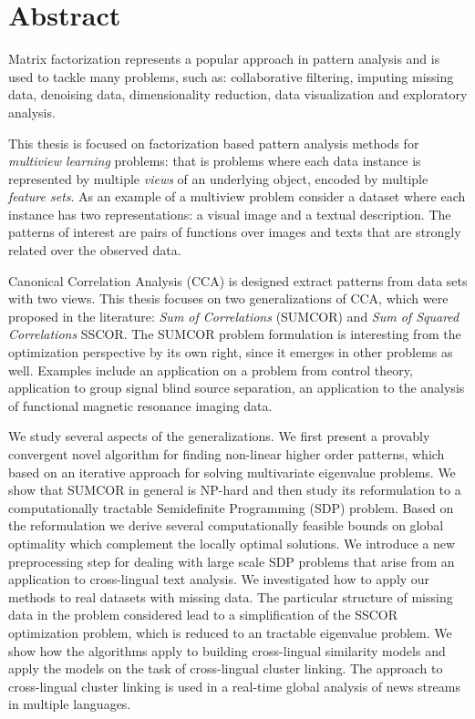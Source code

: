 %
\chapter*{Abstract}

Matrix factorization represents a popular approach in pattern analysis and
is used to tackle many problems, such as: collaborative filtering, imputing
missing data, denoising data, dimensionality reduction, data visualization and
exploratory analysis.  

This thesis is focused on factorization based pattern analysis methods 
for \emph{multiview learning} problems:
that is problems where each data instance is represented by multiple \emph{views} of an underlying
object, encoded by multiple \emph{feature sets}.
As an example of a multiview problem consider a dataset where each instance has two representations: a visual
image and a textual description. The patterns of interest are pairs of functions over images and texts
that are strongly related over the observed data.

Canonical Correlation Analysis (CCA) is designed extract patterns from data sets
with two views. This thesis focuses on two generalizations of CCA, which were proposed
in the literature: \emph{Sum of Correlations} (SUMCOR) and \emph{Sum of Squared Correlations} SSCOR.
The SUMCOR problem formulation is interesting from the optimization perspective by its own right,
since it emerges in other problems as well. Examples include an application on a problem
from control theory, application to group signal blind source separation,
an application to the analysis of functional magnetic resonance imaging data.

We study several aspects of the generalizations. We first present a provably convergent novel algorithm 
for finding non-linear higher order patterns, which based on an iterative approach for solving
multivariate eigenvalue problems. We show that SUMCOR in general is NP-hard and then study
its reformulation to a computationally tractable Semidefinite Programming (SDP) problem. Based
on the reformulation we derive several computationally feasible bounds on global optimality
which complement the locally optimal solutions. We introduce a new preprocessing step
for dealing with large scale SDP problems that arise from an application to cross-lingual
text analysis. We investigated how to apply our methods to real datasets with missing data.
The particular structure of missing data in the problem considered lead to a simplification of the SSCOR
optimization problem, which is reduced to an tractable eigenvalue problem. We show how
the algorithms apply to building cross-lingual similarity models and apply the models on the task
of cross-lingual cluster linking. The approach to cross-lingual cluster linking is used
in a real-time global analysis of news streams in multiple languages.